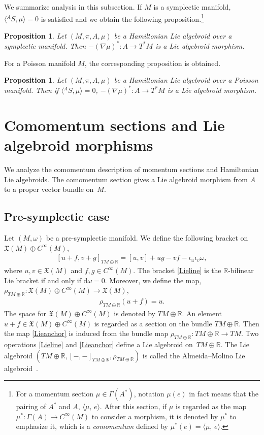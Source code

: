 \documentclass[pdftex]{sigma}
\numberwithin{equation}{section}
\newtheorem{Proposition}[Theorem]{Proposition}
 { \theoremstyle{definition}
\newtheorem{Definition}[Theorem]{Definition}
\newtheorem{Note}[Theorem]{Note}
\newtheorem{Example}[Theorem]{Example}
\newtheorem{Remark}[Theorem]{Remark}
\newtheorem{Question}[Theorem]{Question}
 }
\def\bR{{\mathbb{R}}}
\newcommand{\liebra}[2]{{[{{#1},{#2}}]_{TM \oplus \bR}}}
\newcommand{\rhotr}{\rho_{TM \oplus \bR}}
\newcommand{\bracket}[2]{\langle #1,\,#2\rangle}
\newcommand{\rd}{\mathrm{d}}
\begin{document}
We summarize analysis in this subsection.
If $M$ is a symplectic manifold, $\bigl\langle{}^A S,\mu\bigr\rangle =0$ is satisfied and we obtain the following proposition.\footnote{For a momentum section $\mu \in \Gamma(A^*)$, notation $\mu(e)$ in fact means that the pairing of $A^*$ and $A$, $\bracket{\mu}{e}$. After this section, if $\mu$ is regarded as the map $\mu^*\colon\Gamma(A) \rightarrow C^{\infty}(M)$ to consider a morphism, it is denoted by $\mu^*$ to emphasize it, which is a \textit{comomentum} defined by $\mu^*(e) = \bracket{\mu}{e}$.}
\begin{Proposition}\label{nablamuLAmorphismS}
Let $(M, \pi, A, \mu)$ be a Hamiltonian Lie algebroid over a symplectic manifold.
Then $-(\nabla \mu)^*\colon A \rightarrow T^*M$ is a Lie algebroid morphism.
\end{Proposition}
For a Poisson manifold $M$, the corresponding proposition is obtained.
\begin{Proposition}\label{nablamuLAmorphism}
Let $(M, \pi, A, \mu)$ be a Hamiltonian Lie algebroid over a Poisson manifold.
Then if $\bigl\langle{}^A S,\mu\bigr\rangle =0$, $-(\nabla \mu)^*\colon A \rightarrow T^*M$ is a Lie algebroid morphism.
\end{Proposition}

\section{Comomentum sections and Lie algebroid morphisms}\label{sec:CMSLAM}
We analyze the comomentum description of momentum sections and Hamiltonian Lie algebroids. The comomentum section gives a Lie algebroid morphism from $A$ to a proper vector bundle on~$M$.

\subsection{Pre-symplectic case}\label{presymcom}
Let $(M, \omega)$ be a pre-symplectic manifold.
We define the following bracket on
$\mathfrak{X}(M) \oplus C^{\infty}(M)$,
\begin{gather}
\liebra{u + f}{v + g}
= [u, v] + u g - v f - \iota_u \iota_v \omega,
\label{Lieline}
\end{gather}
where $u, v \in \mathfrak{X}(M)$ and $f, g \in C^{\infty}(M)$.
%
The bracket \eqref{Lieline} is the $\bR$-bilinear Lie bracket
if and only if $\rd \omega = 0$.
Moreover, we define the map,
$\rhotr\colon \mathfrak{X}(M) \oplus C^{\infty}(M)
\rightarrow \mathfrak{X}(M)$,
\begin{gather}
\rhotr(u + f) = u.
\label{Lieanchor}
\end{gather}
The space for $\mathfrak{X}(M) \oplus C^{\infty}(M)$ is denoted by
$TM \oplus \bR$.
An element $u + f \in \mathfrak{X}(M) \oplus C^{\infty}(M)$ is regarded as a
section on the bundle $TM \oplus \bR$.
Then the map \eqref{Lieanchor} is induced from the bundle map
$\rhotr\colon TM \oplus \bR \rightarrow TM$.
Two operations \eqref{Lieline} and \eqref{Lieanchor}
define a Lie algebroid on~${TM \oplus \bR}$.
The Lie algebroid $(TM \oplus \bR, \liebra{-}{-}, \rhotr)$ is
 called the Almeida--Molino Lie algebroid~\cite{Almedia}.
\end{document}
